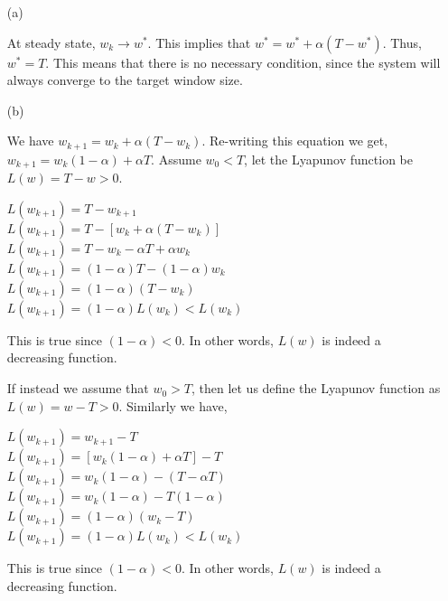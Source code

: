 \documentclass{article}
\begin{document}
\begin{enumerate}
\begin{itemize}
\item[(a)] \smallbreak

\noindent At steady state, $w_k \rightarrow w^*$. This implies
that $w^* = w^* + \alpha(T - w^*)$. Thus, $w^* = T$. This means
that there is no necessary condition, since the system will always
converge to the target window size. \bigbreak


\item[(b)] \smallbreak

\noindent We have $w_{k+1} = w_k + \alpha(T - w_k)$.
Re-writing this equation we get, $w_{k+1} = w_k(1-\alpha) + \alpha T$. 
\noindent 
Assume $w_0 < T$, let the
Lyapunov function be $L(w) = T - w > 0$.

\bigbreak
\noindent $L(w_{k+1}) = T - w_{k+1}$\\
\noindent $L(w_{k+1}) = T - [w_k + \alpha(T - w_k)]$\\
\noindent $L(w_{k+1}) = T - w_k - \alpha T + \alpha w_k$\\
\noindent $L(w_{k+1}) = (1-\alpha)T - (1-\alpha)w_k$\\
\noindent $L(w_{k+1}) = (1-\alpha)(T-w_k)$\\
\noindent $L(w_{k+1}) = (1-\alpha)L(w_k) < L(w_k)$ \bigbreak

\noindent This is true since $(1-\alpha) < 0$. In other words,
$L(w)$ is indeed a decreasing function. \bigbreak

\noindent If instead we assume that $w_0 > T$, then let us define the Lyapunov
function as $L(w) = w - T > 0$. Similarly we have,

\bigbreak
\noindent $L(w_{k+1}) = w_{k+1} - T$\\
\noindent $L(w_{k+1}) = [w_k(1-\alpha) + \alpha T] - T$\\
\noindent $L(w_{k+1}) = w_k(1-\alpha) - (T - \alpha T)$\\
\noindent $L(w_{k+1}) = w_k(1-\alpha) - T(1-\alpha)$\\
\noindent $L(w_{k+1}) = (1-\alpha)(w_k-T)$\\
\noindent $L(w_{k+1}) = (1-\alpha)L(w_k) < L(w_k)$ \bigbreak

\noindent This is true since $(1-\alpha) < 0$. In other words,
$L(w)$ is indeed a decreasing function. \bigbreak
\end{itemize}


\end{enumerate}
\end{document}
